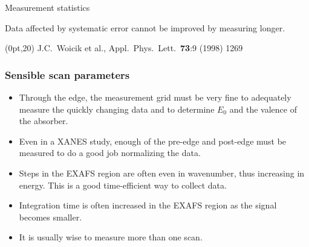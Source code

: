 \documentclass[10pt, xcolor=x11names, compress]{beamer}
\begin{document}
\begin{frame}
\begin{block}{Measurement statistics}
    \smallskip

    Data affected by \alert{systematic} error cannot be improved by
    measuring longer.
  \end{block}
  \begin{textblock*}{0.5\linewidth}(0pt,20\TPVertModule)%
    \tiny%
    J.C.\ Woicik et al., Appl.\ Phys.\ Lett.\ \textbf{73}:9
    (1998) 1269
  \end{textblock*}

\end{frame}

\begin{frame}
  \frametitle{Sensible scan parameters}

  \begin{itemize}
  \item Through the edge, the measurement grid must be very fine to
    adequately measure the quickly changing data and to determine
    $E_0$ and the valence of the absorber.
  \item Even in a XANES study, enough of the pre-edge and post-edge
    must be measured to do a good job normalizing the data.
  \item Steps in the EXAFS region are often even in wavenumber, thus
    increasing in energy.  This is a good time-efficient way to
    collect data.
  \item Integration time is often increased in the EXAFS region as the
    signal becomes smaller.
  \item It is usually wise to measure more than one scan.
  \end{itemize}


\end{frame}
\end{document}

